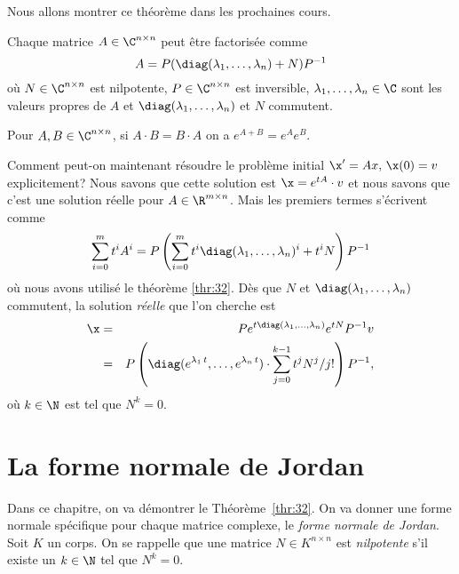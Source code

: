 Nous allons montrer ce théorème dans les prochaines cours.  
\begin{theorem}
  \label{thr:32}
  Chaque matrice $A \in \C^{n \times n}$ peut être factorisée comme 
  \begin{displaymath}
    A = P ( \diag(\lambda_1,\dots,\lambda_n) + N) P^{-1}
  \end{displaymath}
où $N \in \C^{n \times n}$ est nilpotente, $P \in \C^{n \times n}$ est inversible,  $\lambda_1,\dots,\lambda_n \in \C$ sont les valeurs propres de $A$ et $\diag(\lambda_1,\dots,\lambda_n)$ et $N$ commutent. 
\end{theorem}


\begin{lemma}
  \label{lem:18}
  Pour $A,B \in \C^{n \times n}$, si $A\cdot B = B \cdot A$ on a $e^{A+B} = e^A e^B$. 
\end{lemma}



Comment peut-on maintenant résoudre le problème initial $\x' = Ax, \, \x(0) = v$ explicitement? Nous savons que cette solution est $\x = e^{tA} \cdot v$ et nous savons que c'est une solution réelle pour $A \in \R^{m \times n}$. Mais les premiers termes s'écrivent comme 
\begin{displaymath}
  \sum_{i=0}^m t^i A^i = P \left(\sum_{i=0}^m t^i \diag(\lambda_1,\dots,\lambda_n)^i + t^i N \right) P^{-1} 
\end{displaymath}
où nous avons utilisé le théorème \ref{thr:32}. Dès que $N$ et $\diag(\lambda_1,\dots,\lambda_n)$ commutent, la solution \emph{réelle} que l'on cherche est  
\begin{eqnarray*}
  \x & = &  P e^{t\diag(\lambda_1,\dots,\lambda_n)} e^{tN} P^{-1} v \\
     & = & P \left( \diag(e^{\lambda_1 \, t},\dots,e^{\lambda_n \, t})\cdot  \sum_{j=0}^{k-1} t^j N^{j} / j!\right)P^{-1},
\end{eqnarray*}
où $k \in \N$ est tel que $N^k = 0$. 


\chapter{La forme normale de Jordan}
\label{cha:la-forme-normale}




\noindent 
Dans ce chapitre, on va démontrer le Théorème~\ref{thr:32}.  On va donner une forme normale spécifique pour chaque matrice complexe, le \emph{forme normale de Jordan}.
Soit $K$ un corps. 
 On se rappelle que une  matrice $N ∈ K^{n ×n}$ est \emph{nilpotente} s'il existe un $k \in \N$ tel que $N^k = 0$. 


